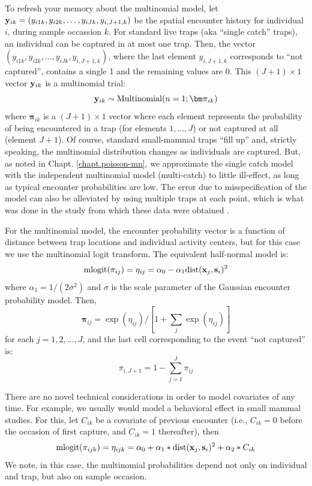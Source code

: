 To refresh your memory about the multinomial model, let ${\bf y}_{ik}
= (y_{i1k},y_{i2k},\ldots,y_{iJk},y_{i,J+1,k})$ be the spatial encounter history
for individual $i$, during sample occassion $k$.  
 For standard live traps (aka
``single catch'' traps), an individual can be captured in at most one
trap. Then, the vector $(y_{i1k},y_{i2k},\ldots,y_{iJk},y_{i,J+1,k})$,
where the last element $y_{i,J+1,k}$ corresponds to ``not captured'',
contains a single 1 and the remaining values are 0.  This $(J+1)\times
1$ vector ${\bf y}_{ik}$ is a multinomial trial:
\[
{\bf y}_{ik} \sim \mbox{Multinomial}(n=1; {\bm \pi}_{ik} )
\]
where ${\bm \pi}_{ik}$ is a $(J+1) \times 1$ vector where each element
represents the probability of being encountered in a trap (for
elements $1,\ldots,J$) or not captured at all (element $J+1$). Of
course, standard small-mammal traps ``fill up'' and, strictly
speaking, the multinomial distribution changes as individuals are
captured. But, as noted in Chapt. \ref{chapt.poisson-mn}, we
approximate the single catch model with the independent multinomial
model (multi-catch) to little ill-effect, as long as typical encounter
probabilities are low. The error due to misspecification of the model
can also be alleviated by using multiple traps at each point, which is
what was done in the study from which these data were obtained
\citep{converse_etal:2006ea, converse_etal:2006jwm}.

For the multinomial model, the encounter probability vector is a
function of distance between trap locations and individual activity
centers, but for this case we use the multinomial logit transform. The
equivalent half-normal model is:
\begin{equation}
\mbox{mlogit}(\pi_{ij}) = \eta_{ij}  =  \alpha_0 - \alpha_{1} \mbox{dist}({\bf x}_{j},{\bf s}_{i})^2   
\label{hscr.eq.mlogit}
\end{equation}
where $\alpha_{1} = 1/(2\sigma^2)$ and $\sigma$ is the scale
parameter of the Gaussian encounter probability model. Then, 
\[
{\bm \pi}_{ij} = \exp(\eta_{ij})/[ 1 + \sum_{j} \exp(\eta_{ij}) ]
\]
for each $j=1,2,\ldots,J$, and the last cell corresponding to the
event ``not captured'' is:
\[
\pi_{i,J+1} = 1- \sum_{j=1}^{J} \pi_{ij}
\]

There are no novel technical considerations in order to model
covariates of any time. 
For example, we usually would model a behavioral
effect in small mammal studies. For this, let
$C_{ik}$ be a covariate of previous encounter
(i.e., $C_{ik} = 0$ before the occasion of first capture, and $C_{ik}
= 1$ thereafter), then
\[
\mbox{mlogit}(\pi_{ijk}) = \eta_{ijk} = \alpha_{0}  +\alpha_{1}*\mbox{dist}({\bf  x}_{j},{\bf s}_{i})^2 +  \alpha_{2}*C_{ik}
\]
We note, in this case, the multinomial probabilities depend not only
on individual and trap, but also on sample occasion.

